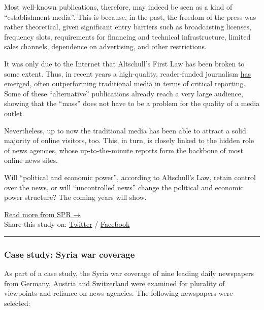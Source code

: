 Most well-known publications, therefore, may indeed be seen as a kind of
``establishment media''. This is because, in the past, the freedom of
the press was rather theoretical, given significant entry barriers such
as broadcasting licenses, frequency slots, requirements for financing
and technical infrastructure, limited sales channels, dependence on
advertising, and other restrictions.

It was only due to the Internet that Altschull's First Law has been
broken to some extent. Thus, in recent years a high-quality,
reader-funded journalism \href{https://swprs.org/media-navigator/}{has
emerged}, often outperforming traditional media in terms of critical
reporting. Some of these ``alternative'' publications already reach a
very large audience, showing that the ``mass'' does not have to be a
problem for the quality of a media outlet.

Nevertheless, up to now the traditional media has been able to attract a
solid majority of online visitors, too. This, in turn, is closely linked
to the hidden role of news agencies, whose up-to-the-minute reports form
the backbone of most online news sites.

Will ``political and economic power'', according to Altschull's Law,
retain control over the news, or will ``uncontrolled news'' change the
political and economic power structure? The coming years will show.

\href{https://swprs.org/contact/}{Read more from SPR →}\\
Share this study on:
\href{https://twitter.com/intent/tweet?url=https://swprs.org/the-propaganda-multiplier/}{Twitter}
/
\href{https://www.facebook.com/share.php?u=https://swprs.org/the-propaganda-multiplier/}{Facebook}

\begin{center}\rule{0.5\linewidth}{\linethickness}\end{center}

\hypertarget{case-study-syria-war-coverage}{%
\subsubsection{Case study: Syria war
coverage}\label{case-study-syria-war-coverage}}

As part of a case study, the Syria war coverage of nine leading daily
newspapers from Germany, Austria and Switzerland were examined for
plurality of viewpoints and reliance on news agencies. The following
newspapers were selected:

